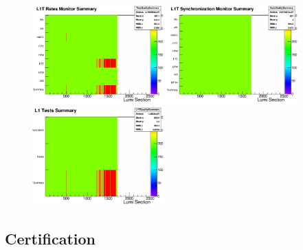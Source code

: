 \begin{figure}[!htb]
\centering
\includegraphics[width=0.45\textwidth]{Chapter03/L1TOnline/Images/RateQualitySummary.png} 
\includegraphics[width=0.45\textwidth]{Chapter03/L1TOnline/Images/SyncQualitySummary.png} \\
\includegraphics[width=0.45\textwidth]{Chapter03/L1TOnline/Images/L1TQualitySummary.png}
\caption{}
\label{figure_ServiceWork_StatusSummary}
\end{figure}

\subsection{Certification}


